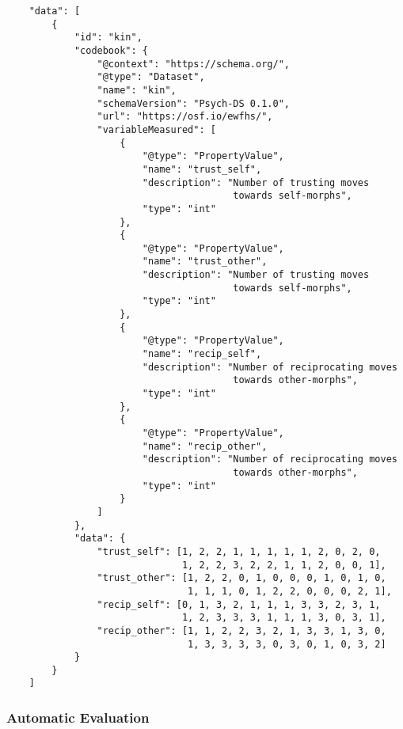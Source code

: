 \documentclass[english,doc,floatsintext]{apa6}
\begin{document}
\begin{tcolorbox}[colback=black!5!white,colframe=white!5!black,title=Box 6. The data component.]
\begin{verbatim}
    "data": [
        {
            "id": "kin",
            "codebook": {
                "@context": "https://schema.org/",
                "@type": "Dataset",
                "name": "kin",
                "schemaVersion": "Psych-DS 0.1.0",
                "url": "https://osf.io/ewfhs/",
                "variableMeasured": [
                    {
                        "@type": "PropertyValue",
                        "name": "trust_self",
                        "description": "Number of trusting moves
                                        towards self-morphs",
                        "type": "int"
                    },
                    {
                        "@type": "PropertyValue",
                        "name": "trust_other",
                        "description": "Number of trusting moves
                                        towards self-morphs",
                        "type": "int"
                    },
                    {
                        "@type": "PropertyValue",
                        "name": "recip_self",
                        "description": "Number of reciprocating moves 
                                        towards other-morphs",
                        "type": "int"
                    },
                    {
                        "@type": "PropertyValue",
                        "name": "recip_other",
                        "description": "Number of reciprocating moves
                                        towards other-morphs",
                        "type": "int"
                    }
                ]
            },
            "data": {
                "trust_self": [1, 2, 2, 1, 1, 1, 1, 1, 2, 0, 2, 0, 
                               1, 2, 2, 3, 2, 2, 1, 1, 2, 0, 0, 1],
                "trust_other": [1, 2, 2, 0, 1, 0, 0, 0, 1, 0, 1, 0,
                                1, 1, 1, 0, 1, 2, 2, 0, 0, 0, 2, 1],
                "recip_self": [0, 1, 3, 2, 1, 1, 1, 3, 3, 2, 3, 1,
                               1, 2, 3, 3, 3, 1, 1, 1, 3, 0, 3, 1],
                "recip_other": [1, 1, 2, 2, 3, 2, 1, 3, 3, 1, 3, 0,
                                1, 3, 3, 3, 3, 0, 3, 0, 1, 0, 3, 2]
            }
        }
    ]
\end{verbatim}
\end{tcolorbox}

\hypertarget{automatic-evaluation}{%
\subsubsection{Automatic Evaluation}\label{automatic-evaluation}}
\end{document}
